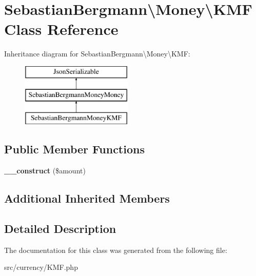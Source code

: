 \hypertarget{classSebastianBergmann_1_1Money_1_1KMF}{}\section{Sebastian\+Bergmann\textbackslash{}Money\textbackslash{}K\+M\+F Class Reference}
\label{classSebastianBergmann_1_1Money_1_1KMF}
Inheritance diagram for Sebastian\+Bergmann\textbackslash{}Money\textbackslash{}K\+M\+F\+:\begin{figure}[H]
\begin{center}
\leavevmode
\includegraphics[height=3.000000cm]{classSebastianBergmann_1_1Money_1_1KMF}
\end{center}
\end{figure}
\subsection*{Public Member Functions}
\begin{DoxyCompactItemize}
\item 
\hypertarget{classSebastianBergmann_1_1Money_1_1KMF_a57beac94fae75dbc380d9ac5e8812844}{}{\bfseries \+\_\+\+\_\+construct} (\$amount)\label{classSebastianBergmann_1_1Money_1_1KMF_a57beac94fae75dbc380d9ac5e8812844}

\end{DoxyCompactItemize}
\subsection*{Additional Inherited Members}


\subsection{Detailed Description}


The documentation for this class was generated from the following file\+:\begin{DoxyCompactItemize}
\item 
src/currency/K\+M\+F.\+php\end{DoxyCompactItemize}
